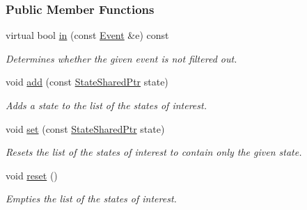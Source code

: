 \subsubsection*{Public Member Functions}
\begin{DoxyCompactItemize}
\item 
virtual bool \hyperlink{structslb_1_1core_1_1ui_1_1FilterState_abacffaaa5ed7700394e99ede2744323c}{in} (const \hyperlink{structslb_1_1core_1_1ui_1_1FilterBase_a4cf70d819855984dc0e15a036e8b8a14}{Event} \&e) const 
\begin{DoxyCompactList}\small\item\em Determines whether the given event is not filtered out. \end{DoxyCompactList}\item 
void \hyperlink{structslb_1_1core_1_1ui_1_1FilterState_a6d8d4b243aae17bf8de0e021cd8978d0}{add} (const \hyperlink{structslb_1_1core_1_1ui_1_1FilterState_a832a02468e2d15393c1937a33988073b}{State\+Shared\+Ptr} state)
\begin{DoxyCompactList}\small\item\em Adds a state to the list of the states of interest. \end{DoxyCompactList}\item 
void \hyperlink{structslb_1_1core_1_1ui_1_1FilterState_a0f0e9f69414535fb3df1287970cfd6b9}{set} (const \hyperlink{structslb_1_1core_1_1ui_1_1FilterState_a832a02468e2d15393c1937a33988073b}{State\+Shared\+Ptr} state)
\begin{DoxyCompactList}\small\item\em Resets the list of the states of interest to contain only the given state. \end{DoxyCompactList}\item 
void \hyperlink{structslb_1_1core_1_1ui_1_1FilterState_a7039b0a4edf4a7d45ea61c0bbcea5b33}{reset} ()\hypertarget{structslb_1_1core_1_1ui_1_1FilterState_a7039b0a4edf4a7d45ea61c0bbcea5b33}{}\label{structslb_1_1core_1_1ui_1_1FilterState_a7039b0a4edf4a7d45ea61c0bbcea5b33}

\begin{DoxyCompactList}\small\item\em Empties the list of the states of interest. \end{DoxyCompactList}\end{DoxyCompactItemize}
